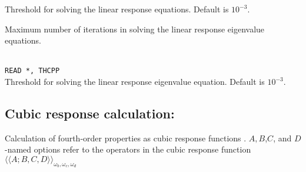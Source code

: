 \begin{description}
\item{}
Threshold for solving the linear response equations.
Default is $10^{-3}$.

\item{}
Maximum number of iterations in solving the linear
response eigenvalue 
equations.

\item{}\\
\verb|READ *, THCPP|\\
Threshold for solving the linear response
eigenvalue equation. Default is $10^{-3}$.

\end{description}

\subsection{Cubic response calculation: }
Calculation of fourth-order properties as cubic response functions
\cite{pndjovhacpl242,djpnhajcp105,pndjhapdkrthhkcpl253}.
$A,B$,$C$, and $D$-named options refer to the operators in the cubic
response function 
$\langle\!\langle A;B,C,D \rangle\!\rangle_{\omega_b,\omega_c,\omega_d}$

